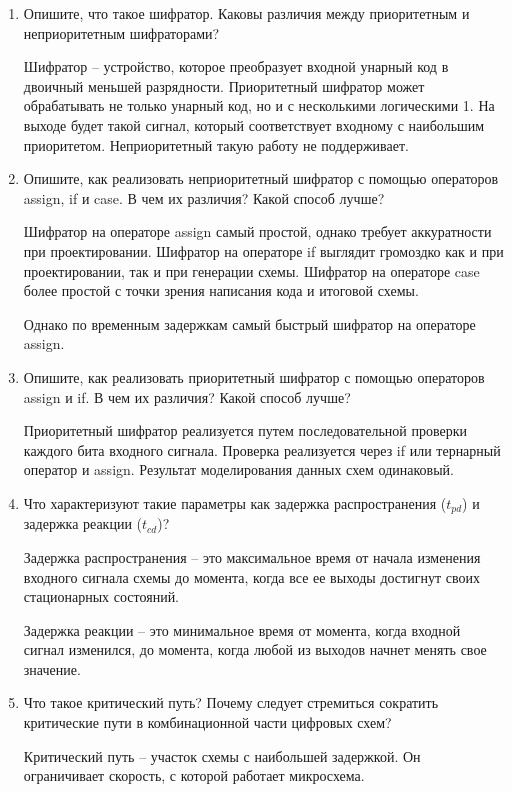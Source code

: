 \documentclass[a4paper,14pt]{article}
\begin{document}
\begin{enumerate}
	\item Опишите, что такое шифратор. 
	Каковы различия между приоритетным и неприоритетным шифраторами?
	
	Шифратор -- устройство, которое преобразует входной унарный код в двоичный меньшей разрядности.
	Приоритетный шифратор может обрабатывать не только унарный код, но и с несколькими логическими 1. 
	На выходе будет такой сигнал, который соответствует входному с наибольшим приоритетом.
	Неприоритетный такую работу не поддерживает.
	
	\item Опишите, как реализовать неприоритетный шифратор с помощью операторов assign,	if и case. 
	В чем их различия? 
	Какой способ лучше?
	
	Шифратор на операторе assign самый простой, однако требует аккуратности при проектировании.
	Шифратор на операторе if выглядит громоздко как и при проектировании, так и при генерации схемы.
	Шифратор на операторе case более простой с точки зрения написания кода и итоговой схемы.
	
	Однако по временным задержкам самый быстрый шифратор на операторе assign.
	
	\item Опишите, как реализовать приоритетный шифратор с помощью операторов assign и if. 
	В чем их различия? 
	Какой способ лучше?
	
	Приоритетный шифратор реализуется путем последовательной проверки каждого бита входного сигнала.
	Проверка реализуется через if или тернарный оператор и assign.
	Результат моделирования данных схем одинаковый.
	
	\item Что характеризуют такие параметры как задержка распространения ($t_{pd}$) и задержка реакции ($t_{cd}$)?
	
	Задержка распространения -- это максимальное время от начала изменения входного сигнала схемы до момента, когда	все ее выходы достигнут своих стационарных состояний.
	
	Задержка реакции -- это	минимальное время от момента, когда входной сигнал изменился, до момента, когда любой из выходов начнет менять свое значение.
	
	\item Что такое критический путь? 
	Почему следует стремиться сократить критические пути в комбинационной части цифровых схем?
	
	Критический путь -- участок схемы с наибольшей задержкой. 
	Он ограничивает скорость, с которой работает микросхема.
	

\end{enumerate}
\end{document}

